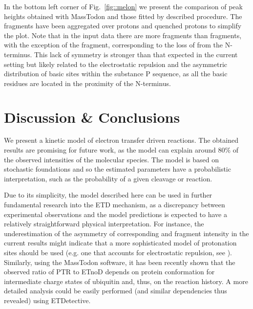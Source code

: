 \documentclass{llncs}
\begin{document}
In the bottom left corner of Fig.~\ref{fig::melon} we present the comparison of peak heights obtained with {\sc MassTodon} and those fitted by described procedure. The fragments have been aggregated over protons and quenched protons to simplify the plot. Note that in the input data there are more  fragments than  fragments, with the exception of the  fragment, corresponding to the loss of  from the N-terminus. This lack of symmetry is stronger than that expected in the current setting but likely related to the electrostatic repulsion and the asymmetric distribution of basic sites within the substance P sequence, as all the basic residues are located in the proximity of the N-terminus.

\section{Discussion \& Conclusions}
We present a kinetic model of electron transfer driven reactions. The obtained results are promising for future work, as the model can explain around $80\%$ of the observed intensities of the molecular species. The model is based on stochastic foundations and so the estimated parameters have a probabilistic interpretation, such as the probability of a given cleavage or reaction.

Due to its simplicity, the model described here can be used in further fundamental research into the ETD mechanism, as a discrepancy between experimental observations and the model predictions is expected to have a relatively straightforward physical interpretation. For instance, the underestimation of the asymmetry of corresponding  and  fragment intensity in the current results might indicate that a more sophisticated model of protonation sites should be used (e.g. one that accounts for electrostatic repulsion, see \cite{Morrison2016-wc}). Similarly, using the {\sc MassTodon} software, it has been recently shown \cite{Lermyte2017-zt} that the observed ratio of PTR to ETnoD depends on protein conformation for intermediate charge states of ubiquitin and, thus, on the reaction history. A more detailed analysis could be easily performed (and similar dependencies thus revealed) using ETDetective.

\end{document}
